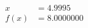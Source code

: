 \documentclass[preview]{standalone}
\begin{document}
\begin{align*}
x &= 4.9995\\f(x) &= 8.0000000
\end{align*}
\end{document}
